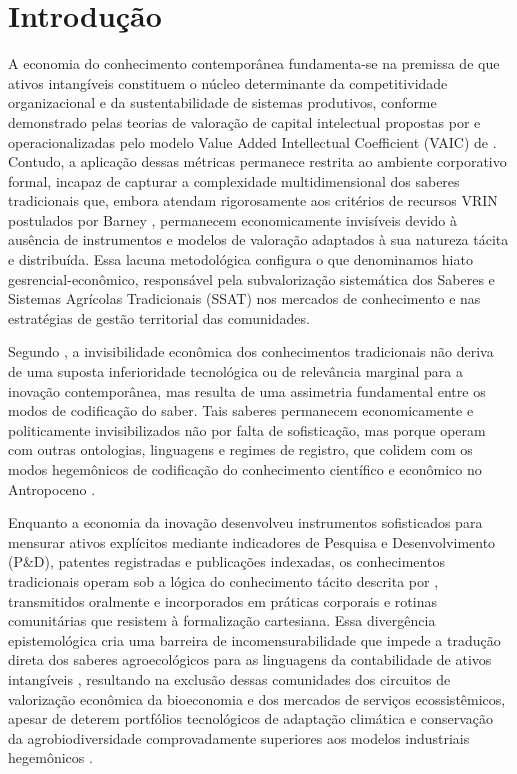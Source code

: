 \newpage

\section{Introdução}

A economia do conhecimento contemporânea fundamenta-se na premissa de que ativos intangíveis constituem o núcleo determinante da competitividade organizacional e da sustentabilidade de sistemas produtivos, conforme demonstrado pelas teorias de valoração de capital intelectual propostas por  e operacionalizadas pelo modelo Value Added Intellectual Coefficient (VAIC) de . Contudo, a aplicação dessas métricas permanece restrita ao ambiente corporativo formal, incapaz de capturar a complexidade multidimensional dos saberes tradicionais que, embora atendam rigorosamente aos critérios de recursos VRIN postulados por Barney \cite{Barney1991}, permanecem economicamente invisíveis devido à ausência de instrumentos e modelos de valoração adaptados à sua natureza tácita e distribuída. Essa lacuna metodológica configura o que denominamos hiato gesrencial-econômico, responsável pela subvalorização sistemática dos Saberes e Sistemas Agrícolas Tradicionais (SSAT) nos mercados de conhecimento e nas estratégias de gestão territorial das comunidades.

Segundo , a invisibilidade econômica dos conhecimentos tradicionais não deriva de uma suposta inferioridade tecnológica ou de relevância marginal para a inovação contemporânea, mas resulta de uma assimetria fundamental entre os modos de codificação do saber. Tais saberes permanecem economicamente e politicamente invisibilizados não por falta de sofisticação, mas porque operam com outras ontologias, linguagens e regimes de registro, que colidem com os modos hegemônicos de codificação do conhecimento científico e econômico no Antropoceno \cite{deCarvalho2016,Agrawal2002}.

Enquanto a economia da inovação desenvolveu instrumentos sofisticados para mensurar ativos explícitos mediante indicadores de Pesquisa e Desenvolvimento (P\&D), patentes registradas e publicações indexadas, os conhecimentos tradicionais operam sob a lógica do conhecimento tácito descrita por , transmitidos oralmente e incorporados em práticas corporais e rotinas comunitárias que resistem à formalização cartesiana. Essa divergência epistemológica cria uma barreira de incomensurabilidade que impede a tradução direta dos saberes agroecológicos para as linguagens da contabilidade de ativos intangíveis \cite{Bastida2022}, resultando na exclusão dessas comunidades dos circuitos de valorização econômica da bioeconomia e dos mercados de serviços ecossistêmicos, apesar de deterem portfólios tecnológicos de adaptação climática e conservação da agrobiodiversidade comprovadamente superiores aos modelos industriais hegemônicos \cite{Laborde2023}.

